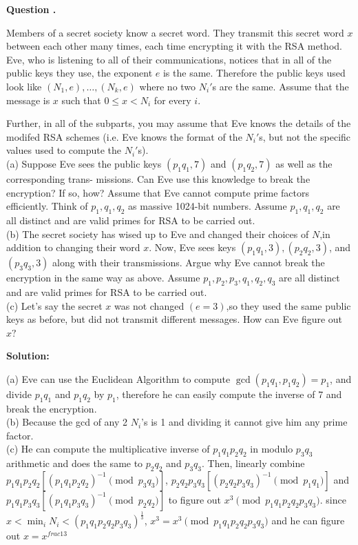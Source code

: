 \documentclass[12pt]{article}
\newcounter{questionnumber}
\newenvironment{question}[1][]{\stepcounter{questionnumber}\par\noindent\textbf{Question \thequestionnumber. #1}\par}{\par}
\newenvironment{solution}{\par\noindent\textbf{Solution:}\par}{\par\vspace{1em}}
\begin{document}
\begin{question}
    Members of a secret society know a secret word. They transmit this secret word $x$ between each other many times, each time encrypting it with the RSA method. Eve, who is listening to all of their communications, notices that in all of the public keys they use, the exponent $e$ is the same. Therefore the public keys used look like $(N_1,e),\ldots,(N_k,e)$ where no two $N_i'$s are the same. Assume that the message is $x$ such that $0\leq x<N_i$ for every $i.$

    Further, in all of the subparts, you may assume that Eve knows the details of the modifed RSA schemes (i.e. Eve knows the format of the $N_i'$s, but not the specific values used to compute the $N_i'$s).\\
    (a) Suppose Eve sees the public keys $(p_1q_1,7)$ and $(p_1q_2,7)$ as well as the corresponding trans-
    missions. Can Eve use this knowledge to break the encryption? If so, how? Assume that Eve cannot compute prime factors efficiently. Think of $p_1,q_1,q_2$ as massive 1024-bit numbers. Assume $p_1,q_1,q_2$ are all distinct and are valid primes for RSA to be carried out.\\
    (b) The secret society has wised up to Eve and changed their choices of $N$,in addition to changing
    their word $x.$ Now, Eve sees keys $(p_1q_1,3),(p_2q_2,3)$, and $(p_3q_3,3)$ along with their transmissions. Argue why Eve cannot break the encryption in the same way as above. Assume $p_1,p_2,p_3,q_1,q_2,q_3$ are all distinct and are valid primes for RSA to be carried out.\\
    (c) Let's say the secret $x$ was not changed $(e=3)$,so they used the same public keys as before, but
    did not transmit different messages. How can Eve figure out $x?$
\end{question}
\begin{solution}
    \noindent
    (a) Eve can use the Euclidean Algorithm to compute $\gcd(p_1q_1, p_1q_2)=p_1$, and divide $p_1q_1$ and $p_1q_2$ by $p_1$, therefore he can easily compute the inverse of 7 and break the encryption.\\
    (b) Because the gcd of any 2 $N_i$'s is 1 and dividing it cannot give him any prime factor.\\
    (c) He can compute the multiplicative inverse of $p_1q_1p_2q_2$ in modulo $p_3q_3$ arithmetic and does the same to $p_2q_2$ and $p_3q_3$.
    Then, linearly combine $p_1q_1p_2q_2[(p_1q_1p_2q_2)^{-1}\pmod{p_3q_3}]$, $p_2q_2p_3q_3[(p_2q_2p_3q_3)^{-1}\pmod{p_1q_1}]$ and $p_1q_1p_3q_3[(p_1q_1p_3q_3)^{-1}\pmod{p_2q_2}]$ to figure out $x^3\pmod{p_1q_1p_2q_2p_3q_3}$.
    since $x<\min_{i}{N_i}<(p_1q_1p_2q_2p_3q_3)^{\frac{1}{3}}$, $x^3=x^3\pmod{p_1q_1p_2q_2p_3q_3}$ and he can figure out $x=x^{frac{1}{3}}$
\end{solution}
\end{document}
